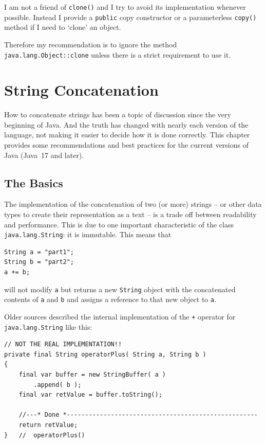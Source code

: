 \documentclass[11pt,a4paper, titlepage, parskip=half, headsepline, footsepline, cleardoublepage=current, headheight=1cm]{scrbook}
\begin{document}
I am not a friend of \lstinline|clone()| and I try to avoid its implementation whenever possible. Instead I provide a \lstinline|public| copy constructor or a parameterless \lstinline|copy()| method if I need to ‘clone’ an object.

Therefore my recommendation is to ignore the method \lstinline|java.lang.Object::clone| unless there is a strict requirement to use it.


\section{String Concatenation}
How to concatenate strings has been a topic of discussion since the very beginning of Java. And the truth has changed with nearly each version of the language, not making it easier to decide how it is done correctly. This chapter provides some recommendations and best practices for the current versions of Java (Java~17 and later).


\subsection{The Basics}
The implementation of the concatenation of two (or more) strings – or other data types to create their representation as a text – is a trade off between readability and performance. This is due to one important characteristic of the class \lstinline|java.lang.String|\autocite{ORACLE_DOC_STRING_CLASS}: it is immutable. This means that
\begin{lstlisting}
String a = "part1";
String b = "part2";
a += b;
\end{lstlisting}
will not modify \lstinline|a| but returns a new \lstinline|String| object with the concatenated contents of \lstinline|a| and \lstinline|b| and assigns a reference to that new object to \lstinline|a|.

Older sources described the internal implementation of the \lstinline|+| operator for \lstinline|java.lang.String| like this:
\begin{lstlisting}
// NOT THE REAL IMPLEMENTATION!!
private final String operatorPlus( String a, String b )
{
    final var buffer = new StringBuffer( a )
        .append( b );
    final var retValue = buffer.toString();
    
    //---* Done *----------------------------------------------------
    return retValue;
}   //  operatorPlus()
\end{lstlisting}
\end{document}
